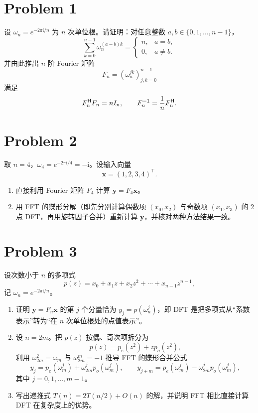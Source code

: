 \section*{Problem 1}

设 $\omega_n = e^{-2\pi \mathrm{i}/n}$ 为 $n$ 次单位根。请证明：对任意整数
$a, b \in \{0, 1, \ldots, n - 1\}$，
\[
    \sum_{k = 0}^{n - 1} \omega_n^{(a - b)k}
    =
    \begin{cases}
        n, & a = b, \\
        0, & a \neq b.
    \end{cases}
\]
并由此推出 $n$ 阶 Fourier 矩阵
\[
    F_n = \left(\omega_n^{jk}\right)_{j,k = 0}^{n - 1}
\]
满足
\[
    F_n^{\mathsf{H}} F_n = n I_n, \qquad F_n^{-1} = \frac{1}{n} F_n^{\mathsf{H}}.
\]

\section*{Problem 2}

取 $n = 4$，$\omega_4 = e^{-2\pi \mathrm{i}/4} = -\mathrm{i}$。设输入向量
\[
    \bm{x} = \left(1, 2, 3, 4\right)^\top.
\]

\begin{enumerate}
    \item 直接利用 Fourier 矩阵 $F_4$ 计算 $\bm{y} = F_4 \bm{x}$。
    \item 用 FFT 的蝶形分解（即先分别计算偶数项 $\left(x_0, x_2\right)$ 与奇数项 $\left(x_1, x_3\right)$ 的 2 点 DFT，再用旋转因子合并）重新计算 $\bm{y}$，并核对两种方法结果一致。
\end{enumerate}

\section*{Problem 3}

设次数小于 $n$ 的多项式
\[
    p(z) = x_0 + x_1 z + x_2 z^2 + \cdots + x_{n - 1} z^{n - 1},
\]
记 $\omega_n = e^{-2\pi \mathrm{i}/n}$。

\begin{enumerate}
    \item 证明 $\bm{y} = F_n \bm{x}$ 的第 $j$ 个分量恰为 $y_j = p(\omega_n^j)$，即 DFT 是把多项式从“系数表示”转为“在 $n$ 次单位根处的点值表示”。
    \item 设 $n = 2m$。把 $p(z)$ 按偶、奇次项拆分为
    \[
        p(z) = p_e(z^2) + z p_o(z^2),
    \]
    利用 $\omega_{2m}^2 = \omega_m$ 与 $\omega_{2m}^m = -1$ 推导 FFT 的蝶形合并公式
    \[
        y_j = p_e(\omega_m^j) + \omega_{2m}^j p_o(\omega_m^j), \qquad
        y_{j + m} = p_e(\omega_m^j) - \omega_{2m}^j p_o(\omega_m^j),
    \]
    其中 $j = 0, 1, \ldots, m - 1$。
    \item 写出递推式 $T(n) = 2T(n/2) + O(n)$ 的解，并说明 FFT 相比直接计算 DFT 在复杂度上的优势。
\end{enumerate}
